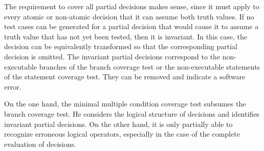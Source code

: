 \documentclass[master,english,smartquotes,apa]{hgbthesis}
\begin{document}

	The requirement to cover all partial decisions makes sense, since it must apply to every atomic or non-atomic decision that it can assume both truth values. If no test cases can be generated for a partial decision that would cause it to assume a truth value that has not yet been tested, then it is invariant. In this case, the decision can be equivalently transformed so that the corresponding partial decision is omitted. The invariant partial decisions correspond to the non-executable branches of the branch coverage test or the non-executable statements of the statement coverage test. They can be removed and indicate a software error.

	On the one hand, the minimal multiple condition coverage test subsumes the branch coverage test. He considers the logical structure of decisions and identifies invariant partial decisions. On the other hand, it is only partially able to recognize erroneous logical operators, especially in the case of the complete evaluation of decisions.
\end{document}
